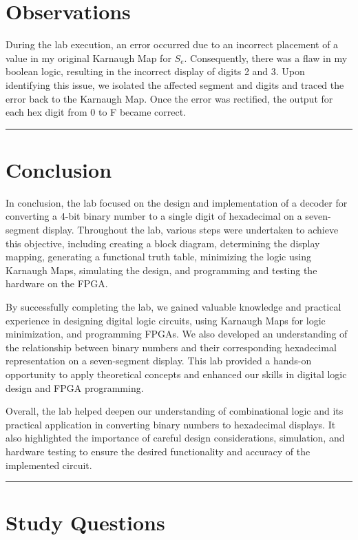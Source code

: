 \documentclass{article}
\begin{document}
\section*{\textcolor{mycolor}{Observations}}
During the lab execution, an error occurred due to an incorrect placement of a value in my original Karnaugh Map for $S_e$. Consequently, there was a flaw in my boolean logic, resulting in the incorrect display of digits 2 and 3. Upon identifying this issue, we isolated the affected segment and digits and traced the error back to the Karnaugh Map. Once the error was rectified, the output for each hex digit from 0 to F became correct.
\vspace{5mm}
\hrule

\section*{\textcolor{mycolor}{Conclusion}}
In conclusion, the lab focused on the design and implementation of a decoder for converting a 4-bit binary number to a single digit of hexadecimal on a seven-segment display. Throughout the lab, various steps were undertaken to achieve this objective, including creating a block diagram, determining the display mapping, generating a functional truth table, minimizing the logic using Karnaugh Maps, simulating the design, and programming and testing the hardware on the FPGA.

By successfully completing the lab, we gained valuable knowledge and practical experience in designing digital logic circuits, using Karnaugh Maps for logic minimization, and programming FPGAs. We also developed an understanding of the relationship between binary numbers and their corresponding hexadecimal representation on a seven-segment display. This lab provided a hands-on opportunity to apply theoretical concepts and enhanced our skills in digital logic design and FPGA programming.

Overall, the lab helped deepen our understanding of combinational logic and its practical application in converting binary numbers to hexadecimal displays. It also highlighted the importance of careful design considerations, simulation, and hardware testing to ensure the desired functionality and accuracy of the implemented circuit.
\vspace{5mm}
\hrule

\section*{\textcolor{mycolor}{Study Questions}}
\end{document}
